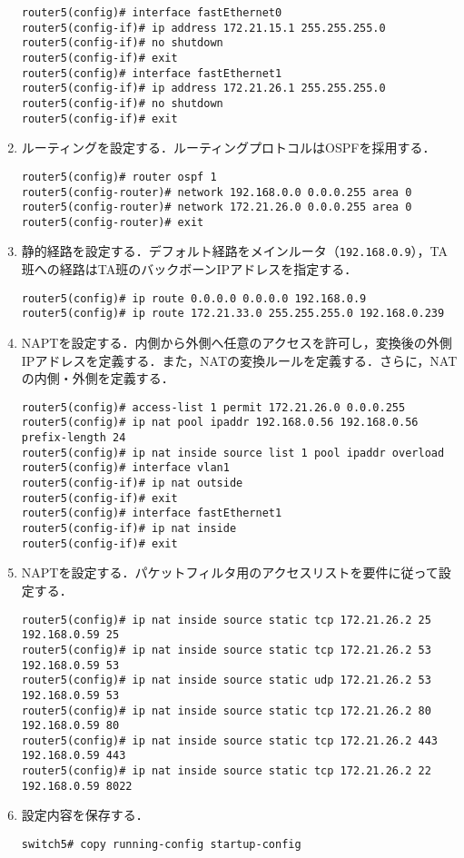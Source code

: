 \begin{enumerate}
          \begin{lstlisting}
router5(config)# interface fastEthernet0
router5(config-if)# ip address 172.21.15.1 255.255.255.0
router5(config-if)# no shutdown
router5(config-if)# exit
router5(config)# interface fastEthernet1
router5(config-if)# ip address 172.21.26.1 255.255.255.0
router5(config-if)# no shutdown
router5(config-if)# exit
    \end{lstlisting}
    \item ルーティングを設定する．ルーティングプロトコルはOSPFを採用する．
          \begin{lstlisting}
router5(config)# router ospf 1
router5(config-router)# network 192.168.0.0 0.0.0.255 area 0
router5(config-router)# network 172.21.26.0 0.0.0.255 area 0
router5(config-router)# exit
\end{lstlisting}
    \item 静的経路を設定する．デフォルト経路をメインルータ（\texttt{192.168.0.9}），TA班への経路はTA班のバックボーンIPアドレスを指定する．
          \begin{lstlisting}
router5(config)# ip route 0.0.0.0 0.0.0.0 192.168.0.9
router5(config)# ip route 172.21.33.0 255.255.255.0 192.168.0.239
\end{lstlisting}
    \item NAPTを設定する．内側から外側へ任意のアクセスを許可し，変換後の外側IPアドレスを定義する．また，NATの変換ルールを定義する．さらに，NATの内側・外側を定義する．
          \begin{lstlisting}
router5(config)# access-list 1 permit 172.21.26.0 0.0.0.255
router5(config)# ip nat pool ipaddr 192.168.0.56 192.168.0.56 prefix-length 24
router5(config)# ip nat inside source list 1 pool ipaddr overload
router5(config)# interface vlan1
router5(config-if)# ip nat outside
router5(config-if)# exit
router5(config)# interface fastEthernet1
router5(config-if)# ip nat inside
router5(config-if)# exit
\end{lstlisting}
    \item NAPTを設定する．パケットフィルタ用のアクセスリストを要件に従って設定する．
          \begin{lstlisting}
router5(config)# ip nat inside source static tcp 172.21.26.2 25 192.168.0.59 25
router5(config)# ip nat inside source static tcp 172.21.26.2 53 192.168.0.59 53
router5(config)# ip nat inside source static udp 172.21.26.2 53 192.168.0.59 53
router5(config)# ip nat inside source static tcp 172.21.26.2 80 192.168.0.59 80
router5(config)# ip nat inside source static tcp 172.21.26.2 443 192.168.0.59 443
router5(config)# ip nat inside source static tcp 172.21.26.2 22 192.168.0.59 8022
\end{lstlisting}
    \item 設定内容を保存する．
          \begin{lstlisting}
switch5# copy running-config startup-config
\end{lstlisting}
\end{enumerate}

